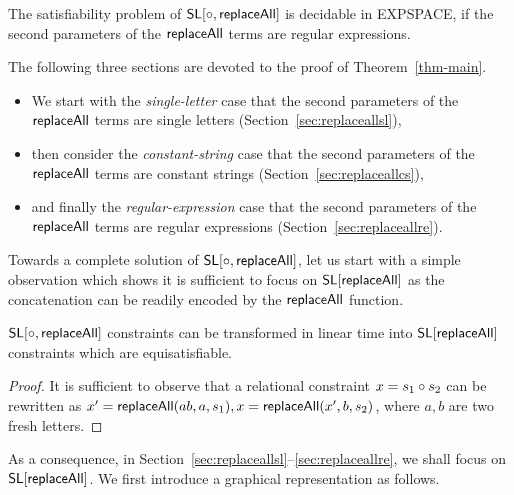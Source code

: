 \begin{theorem}\label{thm-main}
	The satisfiability problem of $\mathsf{SL}[\circ, \mathsf{replaceAll}]$ is decidable in EXPSPACE, if the second parameters of the $\mathsf{replaceAll}$ terms are regular expressions.  
\end{theorem}

The following three sections are devoted to the proof of Theorem~\ref{thm-main}.  
\begin{itemize}
\item We start with the \emph{single-letter} case that the second parameters of the $\mathsf{replaceAll}$ terms are single letters (Section~\ref{sec:replaceallsl}),
\item then consider the \emph{constant-string} case that the second parameters of the $\mathsf{replaceAll}$ terms are constant strings  (Section~\ref{sec:replaceallcs}), \item and finally the \emph{regular-expression} case that the second parameters of the $\mathsf{replaceAll}$ terms are regular expressions  (Section~\ref{sec:replaceallre}).
\end{itemize}

Towards a complete solution of $\mathsf{SL}[\circ, \mathsf{replaceAll}]$, let us start with a simple observation  which shows it is sufficient to focus on $\mathsf{SL}[\mathsf{replaceAll}]$ as the concatenation can be readily encoded by the $\mathsf{replaceAll}$ function.  %

\begin{proposition}\label{prop-concat}
	$\mathsf{SL}[\circ, \mathsf{replaceAll}]$ constraints can be transformed in linear time into $\mathsf{SL}[\mathsf{replaceAll}]$ constraints which are equisatisfiable. 
\end{proposition}
\begin{proof}
	It is sufficient to observe that %
	a relational constraint $x = s_1 \circ s_2$ can be rewritten as $x' = \mathsf{replaceAll}(ab, a, s_1), x = \mathsf{replaceAll}(x', b, s_2)$, where $a,b$ are two fresh letters.
\end{proof}

As a consequence, in Section~\ref{sec:replaceallsl}--\ref{sec:replaceallre}, we shall focus on $\mathsf{SL}[\mathsf{replaceAll}]$. We first introduce a graphical representation as follows.    

